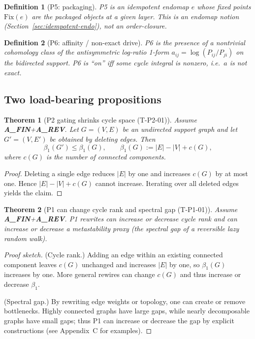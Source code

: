 \documentclass[11pt]{article}
\newtheorem{definition}{Definition}
\newtheorem{theorem}{Theorem}
\theoremstyle{remark}
\begin{document}
\begin{definition}[P5: packaging]
P5 is an idempotent endomap $e$ whose fixed points $\mathrm{Fix}(e)$ are the packaged objects at a
given layer. This is an endomap notion (Section~\ref{sec:idempotent-endo}), not an order-closure.
\end{definition}

\begin{definition}[P6: affinity / non-exact drive]
P6 is the presence of a nontrivial cohomology class of the antisymmetric log-ratio 1-form
$a_{ij}=\log(P_{ij}/P_{ji})$ on the bidirected support. P6 is ``on'' iff some cycle integral is
nonzero, i.e.\ $a$ is not exact.
\end{definition}

\subsection{Two load-bearing propositions}

\begin{theorem}[P2 gating shrinks cycle space (T-P2-01)]
Assume \textbf{A\_FIN}+\textbf{A\_REV}.
Let $G=(V,E)$ be an undirected support graph and let $G'=(V,E')$ be obtained by deleting edges.
Then
\[
\beta_1(G')\le \beta_1(G),
\qquad
\beta_1(G):=|E|-|V|+c(G),
\]
where $c(G)$ is the number of connected components.
\end{theorem}

\begin{proof}
Deleting a single edge reduces $|E|$ by one and increases $c(G)$ by at most one. Hence
$|E|-|V|+c(G)$ cannot increase. Iterating over all deleted edges yields the claim.
\end{proof}

\begin{theorem}[P1 can change cycle rank and spectral gap (T-P1-01)]
Assume \textbf{A\_FIN}+\textbf{A\_REV}.
P1 rewrites can increase or decrease cycle rank and can increase or decrease a metastability proxy
(the spectral gap of a reversible lazy random walk).
\end{theorem}

\begin{proof}[Proof sketch]
(Cycle rank.) Adding an edge within an existing connected component leaves $c(G)$ unchanged and
increases $|E|$ by one, so $\beta_1(G)$ increases by one. More general rewires can change $c(G)$
and thus increase or decrease $\beta_1$.

(Spectral gap.) By rewriting edge weights or topology, one can create or remove bottlenecks.
Highly connected graphs have large gaps, while nearly decomposable graphs have small gaps; thus
P1 can increase or decrease the gap by explicit constructions (see Appendix~C for examples).
\end{proof}
\end{document}
